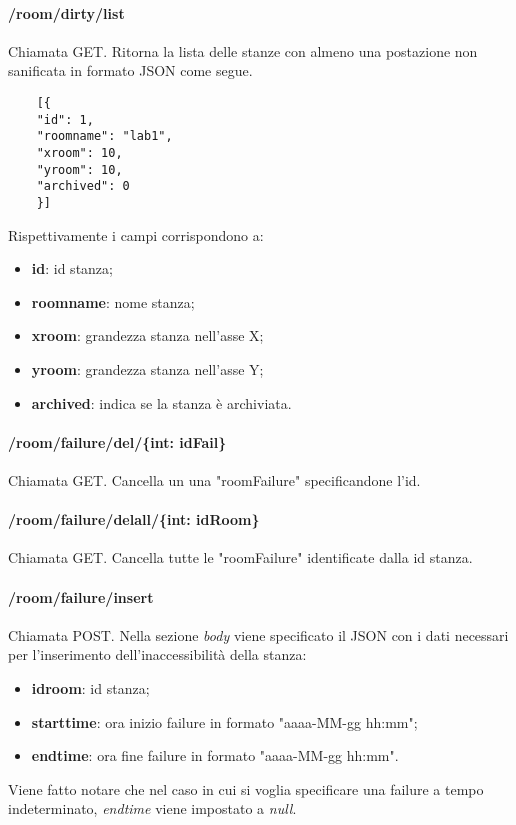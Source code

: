 \paragraph{/room/dirty/list}
Chiamata GET. Ritorna la lista delle stanze con almeno una postazione non sanificata in formato JSON come segue.	\\
\begin{center}
	\begin{lstlisting}
	[{
	"id": 1,
	"roomname": "lab1",
	"xroom": 10,
	"yroom": 10,
	"archived": 0
	}]
	\end{lstlisting}
\end{center}
Rispettivamente i campi corrispondono a:
\begin{itemize}
	\item \textbf{id}: id stanza;
	\item \textbf{roomname}: nome stanza;
	\item \textbf{xroom}: grandezza stanza nell'asse X;
	\item \textbf{yroom}: grandezza stanza nell'asse Y;
	\item \textbf{archived}: indica se la stanza è archiviata.	
\end{itemize}
\paragraph{/room/failure/del/\{int: idFail\}}
Chiamata GET. Cancella un una "roomFailure" specificandone l'id.
\paragraph{/room/failure/delall/\{int: idRoom\}}
Chiamata GET. Cancella tutte le "roomFailure" identificate dalla id stanza.
\paragraph{/room/failure/insert}
Chiamata POST. Nella sezione \textit{body} viene specificato il JSON con i dati necessari per l'inserimento dell'inaccessibilità della stanza:
\begin{itemize}
	\item \textbf{idroom}: id stanza;
	\item \textbf{starttime}: ora inizio failure in formato "aaaa-MM-gg hh:mm";
	\item \textbf{endtime}: ora fine failure in formato "aaaa-MM-gg hh:mm".
\end{itemize}
Viene fatto notare che nel caso in cui si voglia specificare una failure a tempo indeterminato, \textit{endtime} viene impostato a \textit{null}.
